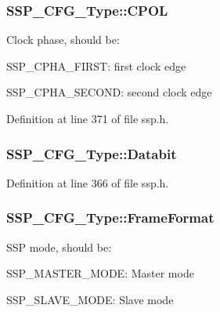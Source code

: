 \subsubsection[{\texorpdfstring{C\+P\+OL}{CPOL}}]{ S\+S\+P\+\_\+\+C\+F\+G\+\_\+\+Type\+::\+C\+P\+OL}\hypertarget{struct_s_s_p___c_f_g___type_ac808d0a31a64e1e8ba7a83029cdf7241}{}\label{struct_s_s_p___c_f_g___type_ac808d0a31a64e1e8ba7a83029cdf7241}
Clock phase, should be\+:
\begin{DoxyItemize}
\item S\+S\+P\+\_\+\+C\+P\+H\+A\+\_\+\+F\+I\+R\+ST\+: first clock edge
\item S\+S\+P\+\_\+\+C\+P\+H\+A\+\_\+\+S\+E\+C\+O\+ND\+: second clock edge 
\end{DoxyItemize}

Definition at line 371 of file ssp.\+h.

\subsubsection[{\texorpdfstring{Databit}{Databit}}]{ S\+S\+P\+\_\+\+C\+F\+G\+\_\+\+Type\+::\+Databit}\hypertarget{struct_s_s_p___c_f_g___type_a7b8cea10875f517ef0af31f82bd1c51a}{}\label{struct_s_s_p___c_f_g___type_a7b8cea10875f517ef0af31f82bd1c51a}


Definition at line 366 of file ssp.\+h.

\subsubsection[{\texorpdfstring{Frame\+Format}{FrameFormat}}]{ S\+S\+P\+\_\+\+C\+F\+G\+\_\+\+Type\+::\+Frame\+Format}\hypertarget{struct_s_s_p___c_f_g___type_acaeda2f05cde2ca11a630a953bbfe852}{}\label{struct_s_s_p___c_f_g___type_acaeda2f05cde2ca11a630a953bbfe852}
S\+SP mode, should be\+:
\begin{DoxyItemize}
\item S\+S\+P\+\_\+\+M\+A\+S\+T\+E\+R\+\_\+\+M\+O\+DE\+: Master mode
\item S\+S\+P\+\_\+\+S\+L\+A\+V\+E\+\_\+\+M\+O\+DE\+: Slave mode 
\end{DoxyItemize}

